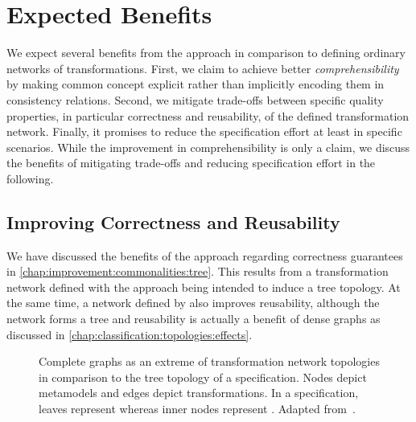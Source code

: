 \section{Expected Benefits}
\label{chap:improvement:benefits}

We expect several benefits from the \commonalities approach in comparison to defining ordinary networks of transformations.
First, we claim to achieve better \emph{comprehensibility} by making common concept explicit rather than implicitly encoding them in consistency relations.
Second, we mitigate trade-offs between specific quality properties, in particular correctness and reusability, of the defined transformation network.
Finally, it promises to reduce the specification effort at least in specific scenarios.
While the improvement in comprehensibility is only a claim, we discuss the benefits of mitigating trade-offs and reducing specification effort in the following.


\subsection{Improving Correctness and Reusability}
\label{chap:improvement:benefits:properties}

We have discussed the benefits of the \commonalities approach regarding correctness guarantees in \autoref{chap:improvement:commonalities:tree}.
This results from a transformation network defined with the \commonalities approach being intended to induce a tree topology.
At the same time, a network defined by \commonalities also improves reusability, although the network forms a tree and reusability is actually a benefit of dense graphs as discussed in \autoref{chap:classification:topologies:effects}.

\begin{figure}
    \centering
    \begin{minipage}[b]{0.49\columnwidth}
        \centering
        
        \label{fig:improvement:topologies:complete}
    \end{minipage}
    \hfill
    \begin{minipage}[b]{0.49\columnwidth}
        \centering
        
        \vspace{1em}
        \label{fig:improvement:topologies:tree}
    \end{minipage}
    \caption[Benefit of \commonalities regarding quality trade-offs]{Complete graphs as an extreme of transformation network topologies in comparison to the tree topology of a \commonalities specification. Nodes depict metamodels and edges depict transformations. In a \commonalities specification, leaves represent \concretemetamodels whereas inner nodes represent \conceptmetamodels. Adapted from~.}
    \label{fig:improvement:topologies}
\end{figure}

